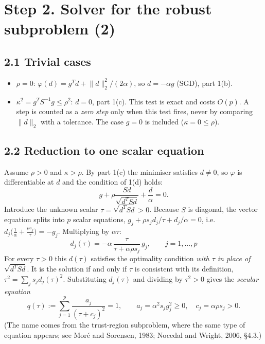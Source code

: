 \documentclass[11pt,a4paper]{article}
\newcommand{\norm}[1]{\lVert #1\rVert_2}
\begin{document}
\section*{Step 2. Solver for the robust subproblem (2)}

\subsection*{2.1 Trivial cases}
\begin{itemize}
\item $\rho=0$: $\varphi(d)=g^Td+\norm d^2/(2\alpha)$, so $d=-\alpha g$ (SGD), part 1(b).
\item $\kappa^2=g^TS^{-1}g\le\rho^2$: $d=0$, part 1(c). This test is exact and costs
$O(p)$. A step is counted as a \emph{zero step} only when this test fires, never by
comparing $\norm d$ with a tolerance. The case $g=0$ is included ($\kappa=0\le\rho$).
\end{itemize}

\subsection*{2.2 Reduction to one scalar equation}

Assume $\rho>0$ and $\kappa>\rho$. By part 1(c) the minimiser satisfies $d\neq0$, so
$\varphi$ is differentiable at $d$ and the condition of 1(d) holds:
\begin{equation*}
g+\rho\frac{Sd}{\sqrt{d^TSd}}+\frac d\alpha=0 .
\end{equation*}
Introduce the unknown scalar $\tau=\sqrt{d^TSd}>0$. Because $S$ is diagonal, the
vector equation splits into $p$ scalar equations,
$g_j+\rho s_jd_j/\tau+d_j/\alpha=0$, i.e.\
$d_j\big(\tfrac1\alpha+\tfrac{\rho s_j}{\tau}\big)=-g_j$. Multiplying by $\alpha\tau$:
\begin{equation*}
\boxed{\;d_j(\tau)=-\alpha\,\frac{\tau}{\tau+\alpha\rho s_j}\,g_j,\qquad j=1,\dots,p\;}
\end{equation*}
For every $\tau>0$ this $d(\tau)$ satisfies the optimality condition \emph{with
$\tau$ in place of $\sqrt{d^TSd}$}. It is the solution if and only if $\tau$ is
consistent with its definition, $\tau^2=\sum_js_jd_j(\tau)^2$. Substituting
$d_j(\tau)$ and dividing by $\tau^2>0$ gives the \emph{secular equation}
\begin{equation*}
q(\tau):=\sum_{j=1}^p\frac{a_j}{(\tau+c_j)^2}=1,\qquad
a_j=\alpha^2s_jg_j^2\ge0,\quad c_j=\alpha\rho s_j>0 .
\end{equation*}
(The name comes from the trust-region subproblem, where the same type of equation
appears; see Moré and Sorensen, 1983; Nocedal and Wright, 2006, §4.3.)
\end{document}
